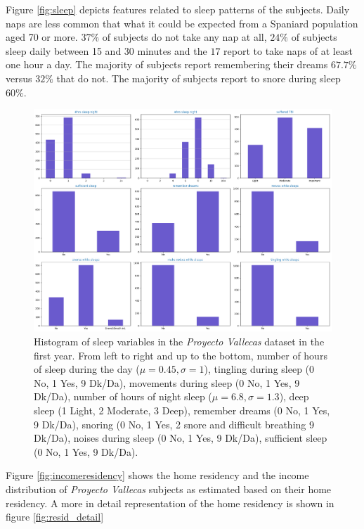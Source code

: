 \documentclass[11pt]{article}
\theoremstyle{definition}
\theoremstyle{remark}
\begin{document}
Figure \ref{fig:sleep} depicts features related to sleep patterns of the subjects. Daily naps are less common that what it could be expected from a Spaniard population aged 70 or more. $37\%$ of subjects do not take any nap at all, $24\%$ of subjects sleep daily between 15 and 30 minutes and the $17$ report to take naps of at least one hour a day. The majority of subjects report remembering their dreams $67.7\%$ versus $32\%$ that do not. The majority of subjects report to snore during sleep $60\%$. 

\begin{figure}[H]
        \centering
        \includegraphics[keepaspectratio, width=\linewidth]{figures/Fig_sleep}
        \caption{Histogram of sleep variables in the \emph{Proyecto Vallecas} dataset in the first year. From left to right and up to the bottom, number of hours of sleep during the day ($\mu=0.45, \sigma=1$), tingling during sleep (0 No, 1 Yes, 9 Dk/Da), movements during sleep (0 No, 1 Yes, 9 Dk/Da), number of hours of night sleep ($\mu=6.8, \sigma=1.3$), deep sleep (1 Light, 2 Moderate, 3 Deep), remember dreams (0 No, 1 Yes, 9 Dk/Da), snoring (0 No, 1 Yes, 2 snore and difficult breathing 9 Dk/Da), noises during sleep (0 No, 1 Yes, 9 Dk/Da), sufficient sleep (0 No, 1 Yes, 9 Dk/Da).} 
        \label{fig:demo}
\end{figure}

Figure \ref{fig:incomeresidency} shows the home residency and the income distribution of \emph{Proyecto Vallecas} subjects as estimated based on their home residency. A more in detail representation of the home residency is shown in figure \ref{fig:resid_detail}
\end{document}
